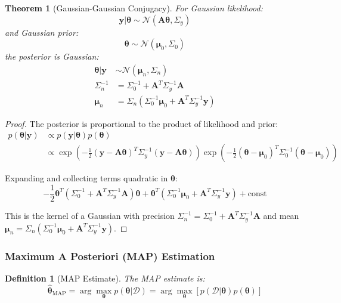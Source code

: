 \documentclass[11pt]{article}
\newtheorem{theorem}{Theorem}[section]
\newtheorem{definition}{Definition}[section]
\begin{document}
\begin{theorem}[Gaussian-Gaussian Conjugacy]
For Gaussian likelihood:
\begin{equation}
\mathbf{y} | \bm{\theta} \sim \mathcal{N}(\mathbf{A}\bm{\theta}, \Sigma_y)
\end{equation}
and Gaussian prior:
\begin{equation}
\bm{\theta} \sim \mathcal{N}(\bm{\mu}_0, \Sigma_0)
\end{equation}
the posterior is Gaussian:
\begin{align}
\bm{\theta} | \mathbf{y} &\sim \mathcal{N}(\bm{\mu}_n, \Sigma_n) \\
\Sigma_n^{-1} &= \Sigma_0^{-1} + \mathbf{A}^T\Sigma_y^{-1}\mathbf{A} \\
\bm{\mu}_n &= \Sigma_n(\Sigma_0^{-1}\bm{\mu}_0 + \mathbf{A}^T\Sigma_y^{-1}\mathbf{y})
\end{align}
\end{theorem}

\begin{proof}
The posterior is proportional to the product of likelihood and prior:
\begin{align}
p(\bm{\theta}|\mathbf{y}) &\propto p(\mathbf{y}|\bm{\theta})p(\bm{\theta}) \\
&\propto \exp\left(-\frac{1}{2}(\mathbf{y} - \mathbf{A}\bm{\theta})^T\Sigma_y^{-1}(\mathbf{y} - \mathbf{A}\bm{\theta})\right) \exp\left(-\frac{1}{2}(\bm{\theta} - \bm{\mu}_0)^T\Sigma_0^{-1}(\bm{\theta} - \bm{\mu}_0)\right)
\end{align}

Expanding and collecting terms quadratic in $\bm{\theta}$:
\begin{equation}
-\frac{1}{2}\bm{\theta}^T(\Sigma_0^{-1} + \mathbf{A}^T\Sigma_y^{-1}\mathbf{A})\bm{\theta} + \bm{\theta}^T(\Sigma_0^{-1}\bm{\mu}_0 + \mathbf{A}^T\Sigma_y^{-1}\mathbf{y}) + \text{const}
\end{equation}

This is the kernel of a Gaussian with precision $\Sigma_n^{-1} = \Sigma_0^{-1} + \mathbf{A}^T\Sigma_y^{-1}\mathbf{A}$ and mean $\bm{\mu}_n = \Sigma_n(\Sigma_0^{-1}\bm{\mu}_0 + \mathbf{A}^T\Sigma_y^{-1}\mathbf{y})$.
\end{proof}

\subsubsection{Maximum A Posteriori (MAP) Estimation}

\begin{definition}[MAP Estimate]
The MAP estimate is:
\begin{equation}
\hat{\bm{\theta}}_{\text{MAP}} = \arg\max_{\bm{\theta}} p(\bm{\theta}|\mathcal{D}) = \arg\max_{\bm{\theta}} \left[p(\mathcal{D}|\bm{\theta})p(\bm{\theta})\right]
\end{equation}
\end{definition}
\end{document}
